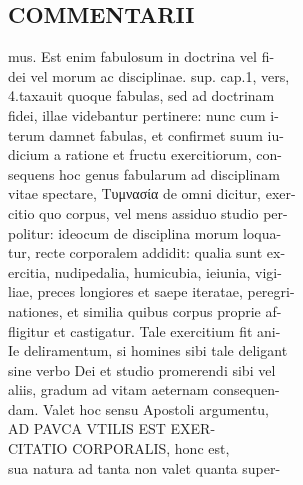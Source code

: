 \documentclass{article}
\begin{document}
\begin{pages}
\section*{COMMENTARII \\
                }mus. Est enim fabulosum in doctrina vel fi- \\
                dei vel morum ac disciplinae. sup. cap.1, vers, \\
                4.taxauit quoque fabulas, sed ad doctrinam \\
                fidei, illae videbantur pertinere: nunc cum i- \\
                terum damnet fabulas, et confirmet suum iu- \\
                dicium a ratione et fructu exercitiorum, con- \\
                sequens hoc genus fabularum ad disciplinam \\
                vitae spectare, Τυμνασία de omni dicitur, exer- \\
                citio quo corpus, vel mens assiduo studio per- \\
                politur: ideocum de disciplina morum loqua- \\
                tur, recte corporalem addidit: qualia sunt ex- \\
                ercitia, nudipedalia, humicubia, ieiunia, vigi- \\
                liae, preces longiores et saepe iteratae, peregri- \\
                nationes, et similia quibus corpus proprie af- \\
                fligitur et castigatur. Tale exercitium fit ani- \\
                Ie deliramentum, si homines sibi tale deligant \\
                sine verbo Dei et studio promerendi sibi vel \\
                aliis, gradum ad vitam aeternam consequen- \\
                dam. Valet hoc sensu Apostoli argumentu, \\
                AD PAVCA VTILIS EST EXER- \\
                CITATIO CORPORALIS, honc est, \\
                sua natura ad tanta non valet quanta super- \\

\end{pages}
\end{document}
